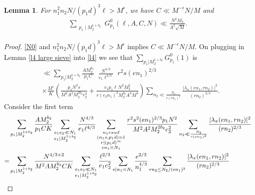 \documentclass[12pt,a4paper,twoside, reqno]{amsart}
\newtheorem{lemma}{Lemma}
\begin{document}
\begin{lemma}\label{large n bound}
For $ n_1^2n_2N/(p_1d)^3 \ell > M^\epsilon$,
    we have $C \ll M^{-\epsilon}N/M$ and 
    \begin{align*}
        \mathop{\sum}_{\substack{p_1 \mid M_2^{1+b_2} }}  G_{p_1}^{0}(\ell, A,C,N) \ll \frac{N^2  M_2}{A^2 \sqrt{M}}.
    \end{align*}
\end{lemma}
\begin{proof}
\eqref{N0} and   $n_1^2n_2N/(p_1d)^3 \ell > M^\epsilon $ implies $C \ll M^{-\epsilon}N/M $. 
    On plugging in   Lemma \eqref{l4 large sieve} into \eqref{l4} we see that  $ \sum_{p_1| M_2^{1+b_2}} G_{p_1}^0(1)$ is 
\begin{align}\label{2 terms}
     &\ll    \sum_{p_1| M_2^{1+b_2}} \frac{A M_2^{b_2} }{p_1 C}\mathop{\sum_{\substack {e_1e_2 \ll N_1 \\ e_1\mid M_2^{1+b_2} }   }}     \frac{ {N^{4/3}}  }{  {e_1 \ell^{4/3}}} \mathop{\sum_{ \substack{n_1rs= \ell \\ (n_1s,p_1d)=1 \\ r | (p_1d)^\infty \\ en_1 \asymp N_1  }}} r^2s (en_1)^{2/3}  \\
    & \times \frac{M^\epsilon}{K}  \left(  \frac{p_1N^2s}{M^2 A^2M_2^{2b_2}e_2^2}+  \frac{ e_1  p_1 \ell^{} N^2M_2^{2}} { r(e_2n_1)^{2} M_2^{b_2}A^3 M^3 {}} {  }{ }  \right) \sum_{n_2 \ll   \frac{N_2}{r (en_1)^2}}     \frac{ {|\lambda_\pi(en_1,rn_2)|^2}}{  {(rn_2)^{2/3}}  }.
\end{align}
Consider  the first term 
\begin{align}\label{first}
         &\sum_{p_1| M_2^{1+b_2}} \frac{A M_2^{b_2} }{p_1 C K}\mathop{\sum_{\substack {e_1e_2 \ll N_1 \\ e_1\mid M_2^{1+b_2} }   }}     \frac{ {N^{4/3}}  }{  {e_1 \ell^{4/3}}} \mathop{\sum_{ \substack{n_1rs= \ell \\ (n_1s,p_1d)=1 \\ r | (p_1d)^\infty \\ en_1 \asymp N_1  }}}  
         \frac{r^2s^2 (en_1)^{2/3}  p_1N^2}{M^2 A^2M_2^{2b_2}e_2^2}  \sum_{n_2 \ll   \frac{N_2}{r (en_1)^2}}     \frac{ {|\lambda_\pi(en_1,rn_2)|^2}}{  {(rn_2)^{2/3}}  } \notag \\
         =&  \sum_{p_1| M_2^{1+b_2}} \frac{N^{4/3+2}  }{M^2 AM_2^{b_2} C K}\mathop{\sum_{\substack {e_1e_2 \ll N_1 \\ e_1\mid M_2^{1+b_2} }   }}  \frac{\ell^{2/3}}{e_1e_2^2 }  \mathop{\sum_{ \substack{e|n_1 \asymp N_1   }}}     \frac{  e^{2/3}}{ n_1^{4/3} }   \sum_{rn_2 \leq N_2/(en_1)^2}\frac{ { |\lambda_\pi(en_1,rn_2)|^2 }}{ { (rn_2)^{2/3}}  }  

\end{align}
\end{proof}
\end{document}
